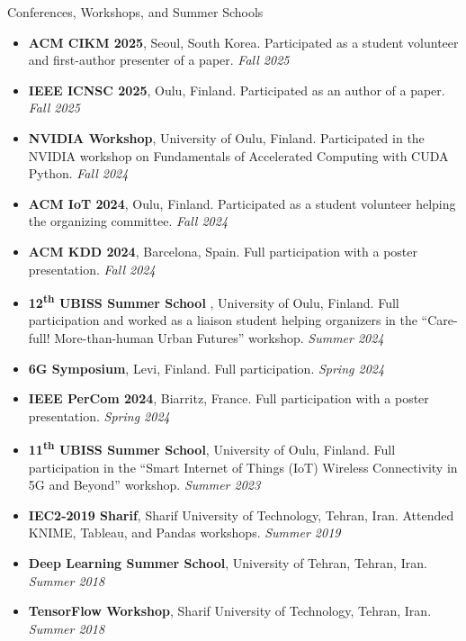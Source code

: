 \documentclass{resume} %
\begin{document}

\begin{rSection}{Conferences, Workshops, and Summer Schools}
\vspace{+.1cm}

\begin{itemize}

    \item {\bf ACM CIKM 2025}, Seoul, South Korea. Participated as a student volunteer and first-author presenter of a paper. {\em Fall 2025}

    \item {\bf IEEE ICNSC 2025}, Oulu, Finland. Participated as an author of a paper. {\em Fall 2025}

    \item {\bf NVIDIA Workshop}, University of Oulu, Finland. Participated in the NVIDIA workshop on Fundamentals of Accelerated Computing with CUDA Python. {\em Fall 2024}

    \item {\bf ACM IoT 2024}, Oulu, Finland. Participated as a student volunteer helping the organizing committee. {\em Fall 2024}

    \item {\bf ACM KDD 2024}, Barcelona, Spain. Full participation with a poster presentation. {\em Fall 2024}

    \item {\bf 12\textsuperscript{th} UBISS Summer School }, University of Oulu, Finland. Full participation and worked as a liaison student helping organizers in the ``Care-full! More-than-human Urban Futures'' workshop. {\em Summer 2024}

    \item {\bf 6G Symposium}, Levi, Finland. Full participation. {\em Spring 2024}

    \item {\bf IEEE PerCom 2024}, Biarritz, France. Full participation with a poster presentation. {\em Spring 2024}

    \item {\bf 11\textsuperscript{th} UBISS Summer School}, University of Oulu, Finland. Full participation in the ``Smart Internet of Things (IoT) Wireless Connectivity in 5G and Beyond'' workshop. {\em Summer 2023}

    \item {\bf IEC2-2019 Sharif}, Sharif University of Technology, Tehran, Iran. Attended KNIME, Tableau, and Pandas workshops. {\em Summer 2019}

    \item {\bf Deep Learning Summer School}, University of Tehran, Tehran, Iran. {\em Summer 2018}

    \item {\bf TensorFlow Workshop}, Sharif University of Technology, Tehran, Iran. {\em Summer 2018}

\end{itemize}

\end{rSection}
\end{document}
